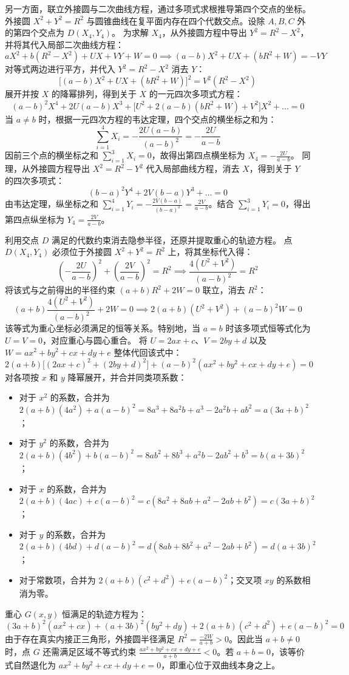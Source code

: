 \begin{solution}
另一方面，联立外接圆与二次曲线方程，通过多项式求根推导第四个交点的坐标。
外接圆 $X^2 + Y^2 = R^2$ 与圆锥曲线在复平面内存在四个代数交点。设除 $A, B, C$ 外的第四个交点为 $D(X_4, Y_4)$。
为求解 $X_4$，从外接圆方程中导出 $Y^2 = R^2 - X^2$，并将其代入局部二次曲线方程：
$$ aX^2 + b(R^2 - X^2) + UX + VY + W = 0 \implies (a-b)X^2 + UX + (bR^2 + W) = -VY $$
对等式两边进行平方，并代入 $Y^2 = R^2 - X^2$ 消去 $Y$：
$$ \big[ (a-b)X^2 + UX + (bR^2 + W) \big]^2 = V^2(R^2 - X^2) $$
展开并按 $X$ 的降幂排列，得到关于 $X$ 的一元四次多项式方程：
$$ (a-b)^2 X^4 + 2U(a-b) X^3 + \big[ U^2 + 2(a-b)(bR^2 + W) + V^2 \big] X^2 + \dots = 0 $$
当 $a \neq b$ 时，根据一元四次方程的韦达定理，四个交点的横坐标之和为：
$$ \sum_{i=1}^4 X_i = -\frac{2U(a-b)}{(a-b)^2} = -\frac{2U}{a-b} $$
因前三个点的横坐标之和 $\sum_{i=1}^3 X_i = 0$，故得出第四点横坐标为 $X_4 = -\frac{2U}{a-b}$。
同理，从外接圆方程导出 $X^2 = R^2 - Y^2$ 代入局部曲线方程，消去 $X$，得到关于 $Y$ 的四次多项式：
$$ (b-a)^2 Y^4 + 2V(b-a) Y^3 + \dots = 0 $$
由韦达定理，纵坐标之和 $\sum_{i=1}^4 Y_i = -\frac{2V(b-a)}{(b-a)^2} = \frac{2V}{a-b}$。结合 $\sum_{i=1}^3 Y_i = 0$，得出第四点纵坐标为 $Y_4 = \frac{2V}{a-b}$。

利用交点 $D$ 满足的代数约束消去隐参半径，还原并提取重心的轨迹方程。
点 $D(X_4, Y_4)$ 必须位于外接圆 $X^2 + Y^2 = R^2$ 上，将其坐标代入得：
$$ \left(-\frac{2U}{a-b}\right)^2 + \left(\frac{2V}{a-b}\right)^2 = R^2 \implies \frac{4(U^2 + V^2)}{(a-b)^2} = R^2 $$
将该式与之前得出的半径约束 $(a+b)R^2 + 2W = 0$ 联立，消去 $R^2$：
$$ (a+b)\frac{4(U^2 + V^2)}{(a-b)^2} + 2W = 0 \implies 2(a+b)(U^2 + V^2) + (a-b)^2 W = 0 $$
该等式为重心坐标必须满足的恒等关系。特别地，当 $a=b$ 时该多项式恒等式化为 $U=V=0$，对应重心与圆心重合。
将 $U = 2ax + c$、$V = 2by + d$ 以及 $W = ax^2 + by^2 + cx + dy + e$ 整体代回该式中：
$$ 2(a+b)\big[(2ax+c)^2 + (2by+d)^2\big] + (a-b)^2(ax^2 + by^2 + cx + dy + e) = 0 $$
对各项按 $x$ 和 $y$ 降幂展开，并合并同类项系数：
\begin{itemize}
\item 对于 $x^2$ 的系数，合并为 $2(a+b)(4a^2) + a(a-b)^2 = 8a^3 + 8a^2b + a^3 - 2a^2b + ab^2 = a(3a+b)^2$；
\item 对于 $y^2$ 的系数，合并为 $2(a+b)(4b^2) + b(a-b)^2 = 8ab^2 + 8b^3 + a^2b - 2ab^2 + b^3 = b(a+3b)^2$；
\item 对于 $x$ 的系数，合并为 $2(a+b)(4ac) + c(a-b)^2 = c(8a^2 + 8ab + a^2 - 2ab + b^2) = c(3a+b)^2$；
\item 对于 $y$ 的系数，合并为 $2(a+b)(4bd) + d(a-b)^2 = d(8ab + 8b^2 + a^2 - 2ab + b^2) = d(a+3b)^2$；
\item 对于常数项，合并为 $2(a+b)(c^2+d^2) + e(a-b)^2$；交叉项 $xy$ 的系数相消为零。
\end{itemize}
重心 $G(x,y)$ 恒满足的轨迹方程为：
$$ (3a+b)^2 (ax^2 + cx) + (a+3b)^2 (by^2 + dy) + 2(a+b)(c^2+d^2) + e(a-b)^2 = 0 $$
由于存在真实内接正三角形，外接圆半径满足 $R^2 = \frac{-2W}{a+b} > 0$。因此当 $a+b \neq 0$ 时，点 $G$ 还需满足区域不等式约束 $\frac{ax^2+by^2+cx+dy+e}{a+b} < 0$。若 $a+b=0$，该等价式自然退化为 $ax^2 + by^2 + cx + dy + e = 0$，即重心位于双曲线本身之上。
\end{solution}


